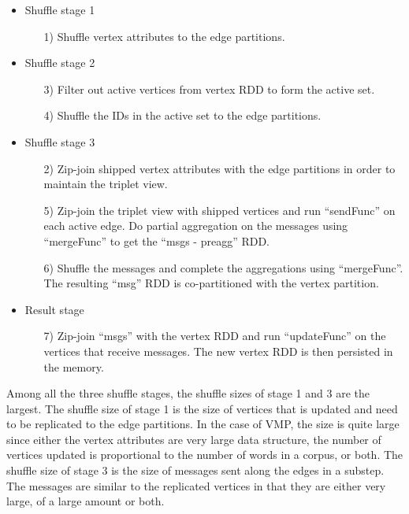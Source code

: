 \begin{itemize}
	\item Shuffle stage 1
		\begin{itemize}
			\item[1)] Shuffle vertex attributes to the edge partitions.
		\end{itemize}

	\item Shuffle stage 2
		\begin{itemize}
			\item[3)] Filter out active vertices from vertex RDD to form the active set.
			\item[4)] Shuffle the IDs in the active set to the edge partitions.
		\end{itemize}

	\item Shuffle stage 3
		\begin{itemize}
			\item[2)] Zip-join shipped vertex attributes with the edge partitions in
				order to maintain the triplet view.
			\item[5)] Zip-join the triplet view with shipped vertices and run
				``sendFunc'' on each active edge. Do partial aggregation on the messages
				using ``mergeFunc'' to get the ``msgs - preagg'' RDD.
			\item[6)] Shuffle the messages and complete the aggregations using
				``mergeFunc''. The resulting ``msg'' RDD is co-partitioned with the
				vertex partition.
		\end{itemize}

	\item Result stage
			\begin{itemize}
				\item[7)] Zip-join ``msgs'' with the vertex RDD and run ``updateFunc'' on
					the vertices that receive messages. The new vertex RDD is then
					persisted in the memory.
			\end{itemize}

\end{itemize}

Among all the three shuffle stages, the shuffle sizes of stage 1 and 3 are the
largest. The shuffle size of stage 1 is the size of vertices that is updated
and need to be replicated to the edge partitions. In the case of VMP,
the size is quite large since either the vertex attributes are very large data
structure, the number of vertices updated is
proportional to the number of words in a corpus, or both. The shuffle size of
stage 3 is the size of messages sent along the edges in a substep. The
messages are similar to the replicated vertices in that they are either very
large, of a large amount or both. 


